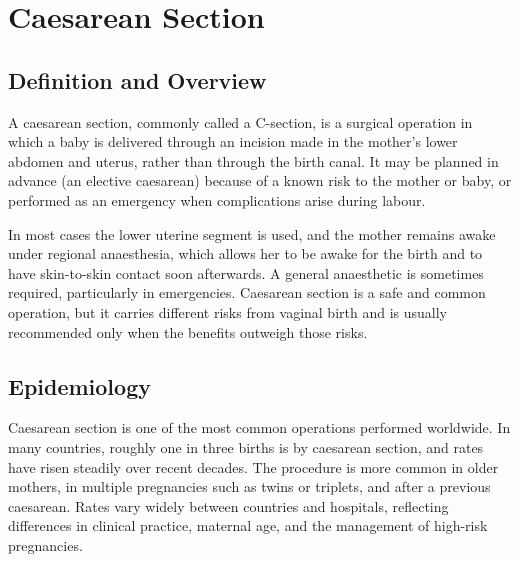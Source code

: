 \chapter{Caesarean Section}

\section*{Definition and Overview}
A caesarean section, commonly called a C-section, is a surgical operation in which a baby is delivered through an incision made in the mother's lower abdomen and uterus, rather than through the birth canal. It may be planned in advance (an elective caesarean) because of a known risk to the mother or baby, or performed as an emergency when complications arise during labour.

In most cases the lower uterine segment is used, and the mother remains awake under regional anaesthesia, which allows her to be awake for the birth and to have skin-to-skin contact soon afterwards. A general anaesthetic is sometimes required, particularly in emergencies. Caesarean section is a safe and common operation, but it carries different risks from vaginal birth and is usually recommended only when the benefits outweigh those risks.

\section*{Epidemiology}
Caesarean section is one of the most common operations performed worldwide. In many countries, roughly one in three births is by caesarean section, and rates have risen steadily over recent decades. The procedure is more common in older mothers, in multiple pregnancies such as twins or triplets, and after a previous caesarean. Rates vary widely between countries and hospitals, reflecting differences in clinical practice, maternal age, and the management of high-risk pregnancies.

